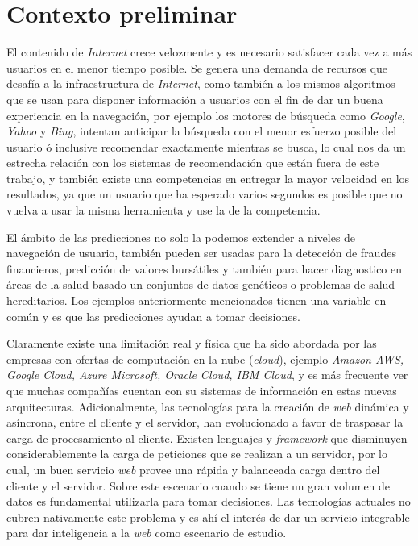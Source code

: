 \section{Contexto preliminar}\label{sec:preliminar}

	
	El contenido de \emph{Internet} crece velozmente y es necesario satisfacer cada vez a más usuarios en el menor tiempo posible. Se genera una demanda de recursos que desafía a la infraestructura de \emph{Internet}, como también a los mismos algoritmos que se usan para disponer información a usuarios con el fin de dar un buena experiencia en la navegación, por ejemplo los motores de búsqueda como \emph{Google}, \emph{Yahoo} y \emph{Bing}, intentan anticipar la búsqueda con el menor esfuerzo posible del usuario ó inclusive recomendar exactamente mientras se busca, lo cual nos da un estrecha relación con los sistemas de recomendación que están fuera de este trabajo, y también existe una competencias en entregar la mayor velocidad en los resultados, ya que un usuario que ha esperado varios segundos es posible que no vuelva a usar la misma herramienta y use la de la competencia.
	
	{El ámbito de las predicciones no solo la podemos extender a niveles de navegación de usuario, también pueden ser usadas para la detección de fraudes financieros, predicción de valores bursátiles y también para hacer diagnostico en áreas de la salud basado un conjuntos de datos genéticos o problemas de salud hereditarios. Los ejemplos anteriormente mencionados tienen una variable en común y es que las predicciones ayudan a tomar decisiones.}\label{ejemplos-casos-contextopreliminar}
	
	 Claramente existe una limitación real y física que ha sido abordada por las empresas con ofertas de computación en la nube (\emph{cloud}), ejemplo \emph{Amazon AWS, Google Cloud, Azure Microsoft, Oracle Cloud, IBM Cloud}, y es más frecuente ver que muchas compañías cuentan con su sistemas de información en estas nuevas arquitecturas. Adicionalmente, las tecnologías para la creación de \emph{web} dinámica y asíncrona, entre el cliente y el servidor, han evolucionado a favor de traspasar la carga de procesamiento al cliente. Existen lenguajes y \emph{framework} que disminuyen considerablemente la carga de peticiones que se realizan a un servidor, por lo cual, un buen servicio \emph{web} provee una rápida y balanceada carga dentro del cliente y el servidor. Sobre este escenario cuando se tiene un gran volumen de datos es fundamental utilizarla para tomar decisiones. Las tecnologías actuales no cubren nativamente este problema y es ahí el interés de dar un servicio integrable para dar inteligencia a la \emph{web} como escenario de estudio.

